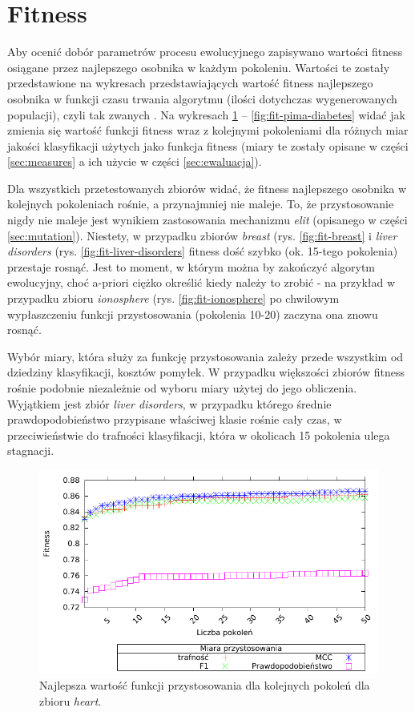 \FloatBarrier
\section{Fitness}
Aby ocenić dobór parametrów procesu ewolucyjnego zapisywano wartości fitness osiągane przez najlepszego osobnika w każdym pokoleniu. Wartości te zostały przedstawione na wykresach przedstawiających wartość fitness najlepszego osobnika w funkcji czasu trwania algorytmu (ilości dotychczas wygenerowanych populacji), czyli tak zwanych . Na wykresach \ref{fig:fit-heart} -- \ref{fig:fit-pima-diabetes} widać jak zmienia się wartość funkcji fitness wraz z kolejnymi pokoleniami dla różnych miar jakości klasyfikacji użytych jako funkcja fitness (miary te zostały opisane w części \ref{sec:measures} a ich użycie w części \ref{sec:ewaluacja}).

Dla wszystkich przetestowanych zbiorów widać, że fitness najlepszego osobnika w kolejnych pokoleniach rośnie, a przynajmniej nie maleje. To, że przystosowanie nigdy nie maleje jest wynikiem zastosowania mechanizmu \emph{elit} (opisanego w części \ref{sec:mutation}). Niestety, w przypadku zbiorów \emph{breast} (rys. \ref{fig:fit-breast} i \emph{liver disorders} (rys. \ref{fig:fit-liver-disorders} fitness dość szybko (ok. 15-tego pokolenia) przestaje rosnąć. Jest to moment, w którym można by zakończyć algorytm ewolucyjny, choć a-priori ciężko określić kiedy należy to zrobić - na przykład w przypadku zbioru \emph{ionosphere} (rys. \ref{fig:fit-ionosphere} po chwilowym wypłaszczeniu funkcji przystosowania (pokolenia 10-20) zaczyna ona znowu rosnąć.

Wybór miary, która służy za funkcję przystosowania zależy przede wszystkim od dziedziny klasyfikacji, kosztów pomyłek. W przypadku większości zbiorów fitness rośnie podobnie niezależnie od wyboru miary użytej do jego obliczenia. Wyjątkiem jest zbiór \emph{liver disorders}, w przypadku którego średnie prawdopodobieństwo przypisane właściwej klasie rośnie cały czas, w przeciwieństwie do trafności klasyfikacji, która w okolicach 15 pokolenia ulega stagnacji.
 


	\begin{figure}
		\includegraphics[scale=0.90]{figures/results/fitness/fitness-heart}
		\caption{Najlepsza wartość funkcji przystosowania dla kolejnych pokoleń dla zbioru \emph{heart}.\label{fig:fit-heart}}
	\end{figure}
	
